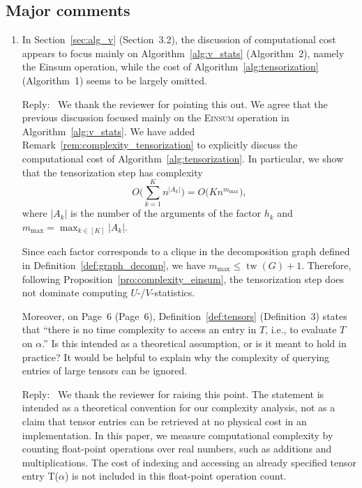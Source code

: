 \documentclass[12pt]{article}
\newenvironment{reply}{\par\smallskip\noindent\color{blue}Reply:\ \ignorespaces}{\par}
\theoremstyle{plain}
\theoremstyle{definition}
\def\Einsum{\textsc{Einsum}}
\begin{document}
\subsection*{Major comments}

\begin{enumerate}

\item In Section~\ref{sec:alg_v} (Section~3.2), the discussion of computational cost appears to focus mainly on Algorithm~\ref{alg:v_stats} (Algorithm~2), namely the Einsum operation, while the cost of Algorithm~\ref{alg:tensorization} (Algorithm~1) seems to be largely omitted. 

\begin{reply}
We thank the reviewer for pointing this out. We agree that the previous discussion focused mainly on the \Einsum{} operation in Algorithm~\ref{alg:v_stats}. We have added Remark~\ref{rem:complexity_tensorization} to explicitly discuss the computational cost of Algorithm~\ref{alg:tensorization}. In particular, we show that the tensorization step has complexity
\begin{equation*}
    O\Bigg(\sum_{k=1}^K n^{|A_k|}\Bigg) 
    = O\Big(K n^{m_{\max}}\Big),
\end{equation*}
where $|A_k|$ is the number of the arguments of the factor $h_k$ and $m_{\max} = \max_{k\in[K]} |A_k|$.

Since each factor corresponds to a clique in the decomposition graph defined in Definition~\ref{def:graph_decomp}, we have $m_{\max} \leq \operatorname{tw}(G) + 1$.
Therefore, following Proposition~\ref{pro:complexity_einsum}, the tensorization step does not dominate computing $U$-/$V$-statistics.
\end{reply}


Moreover, on Page~6 (Page~6), Definition~\ref{def:tensors} (Definition~3) states that ``there is no time complexity to access an entry in $T$, i.e., to evaluate $T$ on $\alpha$.'' Is this intended as a theoretical assumption, or is it meant to hold in practice? It would be helpful to explain why the complexity of querying entries of large tensors can be ignored.

\begin{reply}
    We thank the reviewer for raising this point. The statement is intended as a theoretical convention for our complexity analysis, not as a claim that tensor entries can be retrieved at no physical cost in an implementation. In this paper, we measure computational complexity by counting float-point operations over real numbers, such as additions and multiplications. The cost of indexing and accessing an already specified tensor entry T($\alpha$) is not included in this float-point operation count.
    

\end{reply}
\end{enumerate}
\end{document}
